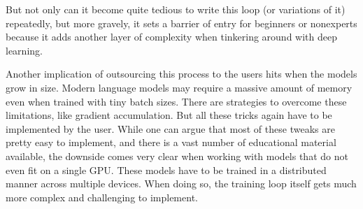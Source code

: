 \documentclass[letterpaper,10pt,english]{jupyterBook}
\begin{document}
\begin{sphinxVerbatimInput}
\begin{sphinxVerbatim}[commandchars=\\\{\}]
         
            
                   
                  
                  
             
                  
                   
                   
                
                  
\end{sphinxVerbatim}
\end{sphinxVerbatimInput}

\sphinxAtStartPar
But not only can it become quite tedious to write this loop (or variations of it) repeatedly, but more gravely, it sets a barrier of entry for beginners or non\sphinxhyphen{}experts because it adds another layer of complexity when tinkering around with deep learning.

\sphinxAtStartPar
Another implication of outsourcing this process to the users hits when the models grow in size. Modern language models may require a massive amount of memory even when trained with tiny batch sizes. There are strategies to overcome these limitations, like gradient accumulation. But all these tricks again have to be implemented by the user.
While one can argue that most of these tweaks are pretty easy to implement, and there is a vast number of educational material available, the downside comes very clear when working with models that do not even fit on a single GPU. These models have to be trained in a distributed manner across multiple devices. When doing so, the training loop itself gets much more complex and challenging to implement.
\end{document}
